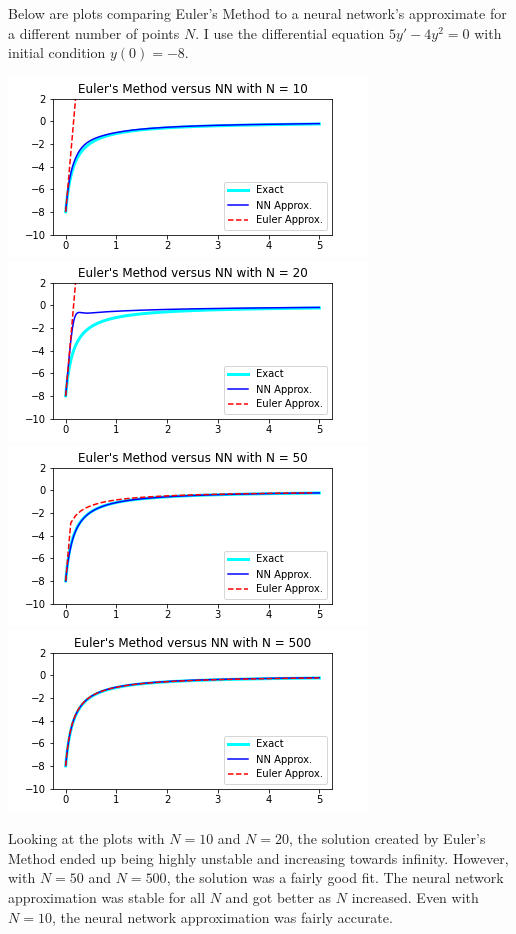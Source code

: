 \documentclass[12pt]{article}
\begin{document}
\begin{description}
    Below are plots comparing Euler's Method to a neural network's approximate
    for a different number of points $N$. I use the differential equation $5y'
    - 4y^2 = 0$ with initial condition $y(0) = -8$. \\
    \begin{minipage}{\linewidth}
        \centering
        \includegraphics[scale=.5]{images/euler10.png}
        \includegraphics[scale=.5]{images/euler20.png}
        \includegraphics[scale=.5]{images/euler50.png}
        \includegraphics[scale=.5]{images/euler500.png}
    \end{minipage}
    Looking at the plots with $N = 10$ and $N = 20$, the solution created by
    Euler's Method ended up being highly unstable and increasing towards
    infinity. However, with $N = 50$ and $N = 500$, the solution was a fairly
    good fit. The neural network approximation was stable for all $N$ and got
    better as $N$ increased. Even with $N = 10$, the neural network
    approximation was fairly accurate. 


\end{description}
\end{document}
